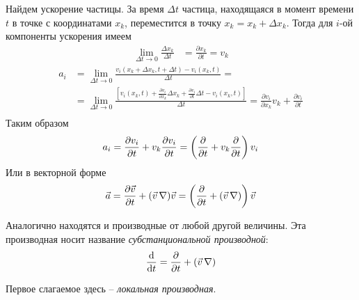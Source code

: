 Найдем ускорение частицы. За время $ \Delta t $ частица, находящаяся в момент времени $t$ в точке с координатами $ x_{k} $, переместится в точку $ x_{k}=x_{k}+\Delta x_{k} $. Тогда для $i$-ой компоненты ускорения имеем
\begin{align*} 
\lim _{\Delta t \rightarrow 0} \frac{\Delta x_{k}}{\Delta t} &=\frac{\partial x_{k}}{\partial t}=v_{k} 
\end{align*}
\begin{align*}
a_{i} &=\lim _{\Delta t \rightarrow 0} \frac{v_{i}\left(x_{k}+\Delta x_{k}, t+\Delta t\right)-v_{i}\left(x_{k}, t\right)}{\Delta t} = \\
&=\lim _{\Delta t \rightarrow 0}\frac{\left[v_{i}\left(x_{k}, t\right)+\frac{\partial v_{i}}{\partial x_{k}} \Delta x_{k}+\frac{\partial v_{i}}{\partial t}\Delta t-v_{i}\left(x_{k}, t\right)\right]}{\Delta t} =\frac{\partial v_{i}}{\partial x_{k}} v_{k}+\frac{\partial v_{i}}{\partial t} \\
\end{align*}
Таким образом 
\begin{align*} 
a_{i} =\frac{\partial v_{i}}{\partial t}+v_{k} \frac{\partial v_{i}}{\partial t}=\left(\pdv{t}+v_{k} \pdv{t}\right) v_{i}
\end{align*}
Или в векторной форме
\begin{equation}
	\vec{a} =\frac{\partial \vec{v}}{\partial t}+(\vec{v}\,\nabla) \vec{v}=\left(\pdv{t}+(\vec{v}\,\nabla)\right) \vec{v}
\end{equation}

Аналогично находятся и производные от любой другой величины. Эта производная носит название \textit{субстанциональной производной}:
\begin{align*} 
\dv{t}=\pdv{t}+(\vec{v}\,\nabla)
\end{align*}

Первое слагаемое здесь -- \textit{локальная производная}.


